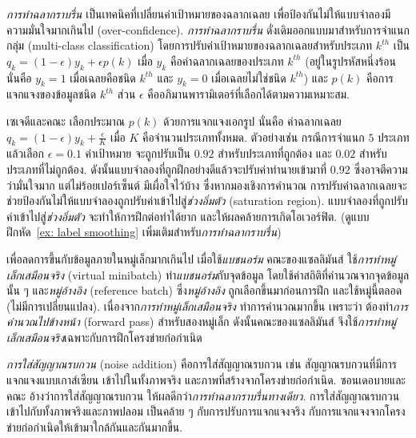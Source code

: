 
\textit{การทำฉลากราบรื่น}\cite{MullerEtAl2019, SzegedyEtAl2016}
เป็นเทคนิคที่เปลี่ยนค่าเป้าหมายของฉลากเฉลย เพื่อป้องกันไม่ให้แบบจำลองมีความมั่นใจมากเกินไป (over-confidence).
\textit{การทำฉลากราบรื่น} ดั่งเดิมออกแบบมาสำหรับการจำแนกกลุ่ม (multi-class classification)
โดยการปรับค่าเป้าหมายของฉลากเฉลยสำหรับประเภท $k^{th}$ 
เป็น $q_k = (1 - \epsilon) y_k + \epsilon p(k)$
เมื่อ $y_k$ คือค่าฉลากเฉลยของประเภท $k^{th}$  (อยู่ในรูปรหัสหนึ่งร้อน นั่นคือ $y_k = 1$ เมื่อเฉลยคือชนิด $k^{th}$ และ $y_k = 0$ เมื่อเฉลยไม่ใช่ชนิด $k^{th}$)
และ $p(k)$ คือการแจกแจงของข้อมูลชนิด $k^{th}$
ส่วน $\epsilon$ คืออภิมานพารามิเตอร์ที่เลือกได้ตามความเหมาะสม.

เซเจดีและคณะ\cite{SzegedyEtAl2016} เลือกประมาณ $p(k)$ ด้วยการแจกแจงเอกรูป
นั่นคือ ค่าฉลากเฉลย $q_k = (1 - \epsilon) y_k + \frac{\epsilon}{K}$ เมื่อ $K$ คือจำนวนประเภททั้งหมด.
ตัวอย่างเช่น กรณีการจำแนก $5$ ประเภท แล้วเลือก $\epsilon = 0.1$ 
ค่าเป้าหมาย จะถูกปรับเป็น $0.92$ สำหรับประเภทที่ถูกต้อง และ $0.02$ สำหรับประเภทที่ไม่ถูกต้อง.
ดังนั้นแบบจำลองที่ถูกฝึกอย่างดีแล้วจะปรับค่าทำนายเข้ามาที่ $0.92$ ซึ่งอาจตีความว่ามั่นใจมาก แต่ไม่ร้อยเปอร์เซ็นต์ มีเผื่อใจไว้บ้าง
ซึ่งหากมองเชิงการคำนวณ การปรับค่าฉลากเฉลยจะช่วยป้องกันไม่ให้แบบจำลองถูกปรับค่าเข้าไปสู่\textit{ช่วงอิ่มตัว} (saturation region). แบบจำลองที่ถูกปรับค่าเข้าไปสู่\textit{ช่วงอิ่มตัว} จะทำให้การฝึกต่อทำได้ยาก และให้ผลคล้ายการเกิดโอเวอร์ฟิต.
(ดูแบบฝึกหัด~\ref{ex: label smoothing} เพิ่มเติมสำหรับ\textit{การทำฉลากราบรื่น})


เพื่อลดการขึ้นกับข้อมูลภายในหมู่เล็กมากเกินไป เมื่อใช้\textit{แบชนอร์ม}
คณะของแซลลิมันส์\cite{SalimansEtAl2016} 
ใช้\textit{การทำหมู่เล็กเสมือนจริง} (virtual minibatch)
ทำ\textit{แบชนอร์ม}กับจุดข้อมูล 
โดยใช้ค่าสถิติที่คำนวณจากจุดข้อมูลนั้น ๆ และ\textit{หมู่อ้างอิง} (reference batch)
ซึ่ง\textit{หมู่อ้างอิง} ถูกเลือกขึ้นมาก่อนการฝึก และใช้หมู่นี้ตลอด (ไม่มีการเปลี่ยนแปลง).
เนื่องจาก\textit{การทำหมู่เล็กเสมือนจริง} ทำการคำนวณมากขึ้น 
เพราะว่า ต้องทำ\textit{การคำนวณไปข้างหน้า} (forward pass) สำหรับสองหมู่เล็ก 
ดังนั้นคณะของแซลลิมันส์ จึงใช้\textit{การทำหมู่เล็กเสมือนจริง}เฉพาะกับการฝึกโครงข่ายก่อกำเนิด

\textit{การใส่สัญญาณรบกวน} (noise addition)
คือการใส่สัญญาณรบกวน เช่น สัญญาณรบกวนที่มีการแจกแจงแบบเกาส์เซียน
เข้าไปในทั้งภาพจริง และภาพที่สร้างจากโครงข่ายก่อกำเนิด.
ซอนเดอบายและคณะ\cite{SonderbyEtAl} อ้างว่าการใส่สัญญาณรบกวน ให้ผลดีกว่า\textit{การทำฉลากราบรื่นทางเดียว}.
การใส่สัญญาณรบกวนเข้าไปกับทั้งภาพจริงและภาพปลอม เป็นคล้าย ๆ กับการปรับการแจกแจงจริง กับการแจกแจงจากโครงข่ายก่อกำเนิดให้เข้ามาใกล้กันและกันมากขึ้น.

